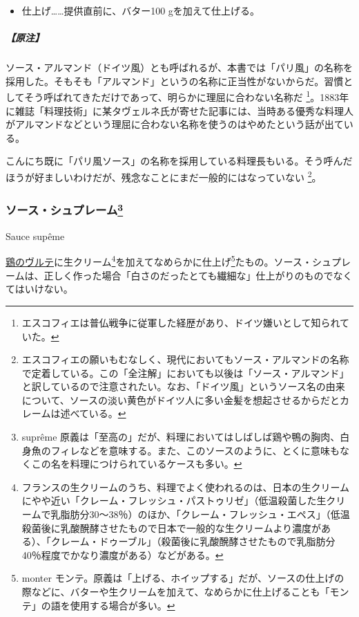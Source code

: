 \begin{recette}
\begin{itemize}
\tightlist
\item
  仕上げ\ldots{}\ldots{}提供直前に、バター100 gを加えて仕上げる。
\end{itemize}

\hypertarget{nota-sauce-allemande}{%
\subparagraph{【原注】}\label{nota-sauce-allemande}}

ソース・アルマンド（ドイツ風）とも呼ばれるが、本書では「パリ風」の名称を採用した。そもそも「アルマンド」というの名称に正当性がないからだ。習慣としてそう呼ばれてきただけであって、明らかに理屈に合わない名称だ
\footnote{エスコフィエは普仏戦争に従軍した経歴があり、ドイツ嫌いとして知られていた。}。1883年に雑誌「料理技術」に某タヴェルネ氏が寄せた記事には、当時ある優秀な料理人がアルマンドなどという理屈に合わない名称を使うのはやめたという話が出ている。

こんにち既に「パリ風ソース」の名称を採用している料理長もいる。そう呼んだほうが好ましいわけだが、残念なことにまだ一般的にはなっていない
\footnote{エスコフィエの願いもむなしく、現代においてもソース・アルマンドの名称で定着している。この「全注解」においても以後は「ソース・アルマンド」と訳しているので注意されたい。なお、「ドイツ風」というソース名の由来について、ソースの淡い黄色がドイツ人に多い金髪を想起させるからだとカレームは述べている。}。

\atoaki{}

\hypertarget{sauce-supreme}{%
\subsubsection[ソース・シュプレーム]{\texorpdfstring{ソース・シュプレーム\footnote{suprême
  原義は「至高の」だが、料理においてはしばしば鶏や鴨の胸肉、白身魚のフィレなどを意味する。また、このソースのように、とくに意味もなくこの名を料理につけられているケースも多い。}}{ソース・シュプレーム}}\label{sauce-supreme}}

\begin{frsubenv}

Sauce supême

\end{frsubenv}

 

\protect\hyperlink{veloute-de-volaille}{鶏のヴルテ}に生クリーム\footnote{フランスの生クリームのうち、料理でよく使われるのは、日本の生クリームにやや近い「クレーム・フレッシュ・パストゥリゼ」（低温殺菌した生クリームで乳脂肪分30〜38％）のほか、「クレーム・フレッシュ・エペス」（低温殺菌後に乳酸醗酵させたもので日本で一般的な生クリームより濃度がある）、「クレーム・ドゥーブル」（殺菌後に乳酸醗酵させたもので乳脂肪分40％程度でかなり濃度がある）などがある。}を加えてなめらかに仕上げ\footnote{monter
  モンテ。原義は「上げる、ホイップする」だが、ソースの仕上げの際などに、バターや生クリームを加えて、なめらかに仕上げることも「モンテ」の語を使用する場合が多い。}たもの。ソース・シュプレームは、正しく作った場合「白さのだったとても繊細な」仕上がりのものでなくてはいけない。


\end{recette}
